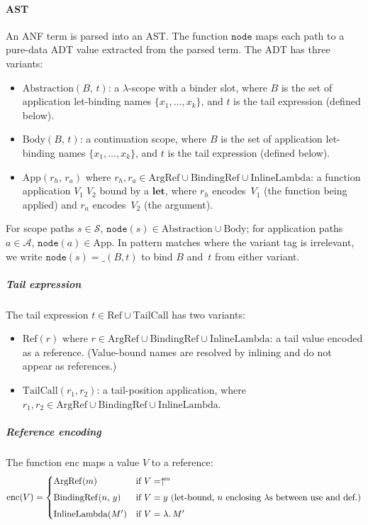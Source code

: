 \paragraph{AST}
An ANF term is parsed into an AST\@.
The function $\mathtt{node}$ maps each path to a
pure-data ADT value extracted from the parsed term.
The ADT has three variants:
\begin{itemize}
  \item $\mathrm{Abstraction}(B,\, t)$:
    a $\lambda$-scope with a binder slot,
    where $B$ is the set of application let-binding names
    $\{x_1, \ldots, x_k\}$, and $t$ is the tail
    expression (defined below).
  \item $\mathrm{Body}(B,\, t)$:
    a continuation scope,
    where $B$ is the set of application let-binding names
    $\{x_1, \ldots, x_k\}$, and $t$ is the tail
    expression (defined below).
  \item $\mathrm{App}(r_h,\, r_a)$ where
    $r_h, r_a \in \mathrm{ArgRef} \cup
    \mathrm{BindingRef} \cup \mathrm{InlineLambda}$:
    a function application $V_1\; V_2$ bound by a
    $\mathbf{let}$, where $r_h$ encodes~$V_1$
    (the function being applied) and $r_a$ encodes~$V_2$
    (the argument).
\end{itemize}
For scope paths $s \in \mathcal{S}$,
$\mathtt{node}(s) \in
\mathrm{Abstraction} \cup \mathrm{Body}$;
for application paths $a \in \mathcal{A}$,
$\mathtt{node}(a) \in \mathrm{App}$.
In pattern matches where the variant tag is irrelevant,
we write $\mathtt{node}(s) = \_(B, t)$ to bind $B$
and~$t$ from either variant.

\subparagraph{Tail expression}
The tail expression
$t \in \mathrm{Ref} \cup \mathrm{TailCall}$
has two variants:
\begin{itemize}
  \item $\mathrm{Ref}(r)$ where
    $r \in \mathrm{ArgRef} \cup \mathrm{BindingRef}
    \cup \mathrm{InlineLambda}$:
    a tail value encoded as a reference.
    (Value-bound names are resolved by inlining
    and do not appear as references.)
  \item $\mathrm{TailCall}(r_1, r_2)$: a tail-position
    application, where
    $r_1, r_2 \in \mathrm{ArgRef} \cup
    \mathrm{BindingRef} \cup \mathrm{InlineLambda}$.
\end{itemize}

\subparagraph{Reference encoding}
The function $\mathrm{enc}$ maps a value $V$ to a
reference:
\[
  \mathrm{enc}(V) =
  \begin{cases}
    \mathrm{ArgRef}(m)
    & \text{if } V = \uparrow^{\!m} \\[4pt]
    \mathrm{BindingRef}(n,\, y)
    & \text{if } V = y \text{ (let-bound, $n$
    enclosing $\lambda$s between use and def.)} \\[4pt]
    \mathrm{InlineLambda}(M')
    & \text{if } V = \lambda.\, M'
  \end{cases}
\]

